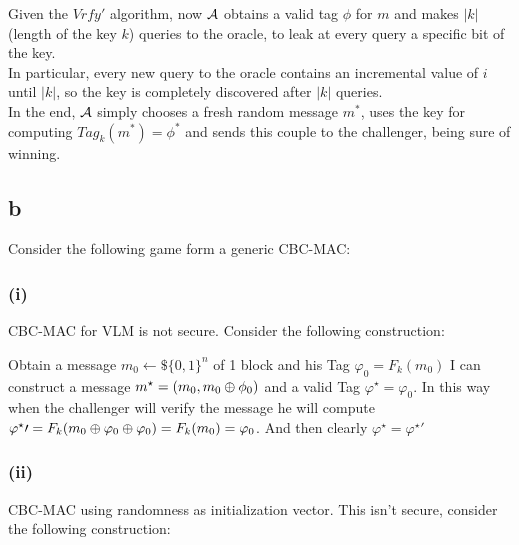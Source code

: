 \documentclass[11pt]{article}
\newcounter{t0d0_counter}
\begin{document}
Given the $Vrfy'$ algorithm, now $\mathcal{A}$ obtains a valid tag $\phi$ for $m$ and
makes $|k|$ (length of the key $k$) queries to the oracle, to leak at every 
query a specific bit of the key.\\
In particular, every new query to the oracle contains an incremental value of
$i$ until $|k|$, so the key is completely discovered after $|k|$ queries.\\

In the end, $\mathcal{A}$ simply chooses a fresh random message $m^{*}$, uses the key for
computing $Tag_{k}(m^{*})=\phi^{*}$ and sends this couple to the challenger,
being sure of winning.

\subsection{b}

Consider the following game form a generic CBC-MAC:

\begin{figure}[h!]
   \centering
   \sdinit{}
\end{figure}

\subsubsection{(i)}
CBC-MAC for VLM is not secure. Consider the following construction:

Obtain a message $m_0\leftarrow\$\{0,1\}^n$ of 1 block and his Tag $\varphi_0 =F_k(m_0)$
I can construct a message $m^\star=(m_0,m_0\oplus \phi_0)$ and a valid Tag $\varphi^\star=\varphi_0$.
In this way when the challenger will verify the message he will compute $\varphi^\star\prime=F_k(m_0\oplus\varphi_0\oplus\varphi_0)=F_k(m_0)=\varphi_0$. 
And then clearly $\varphi^\star=\varphi^\star\prime$

\subsubsection{(ii)}
CBC-MAC using randomness as initialization vector. This isn't secure, consider the following construction:
\end{document}
